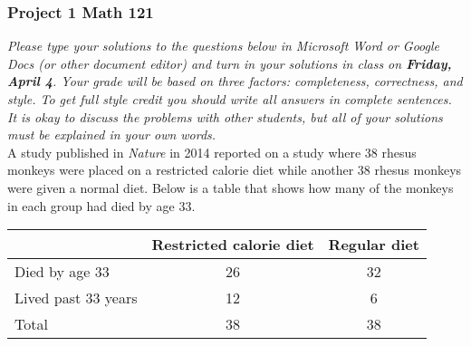\documentclass[12pt]{article}
\begin{document}
\subsubsection*{Project 1 \hfill Math 121}

\textit{Please type your solutions to the questions below in Microsoft Word or Google Docs (or other document editor) and turn in your solutions in class on \textbf{Friday, April 4}. Your grade will be based on three factors: completeness, correctness, and style. To get full style credit you should write all answers in complete sentences. It is okay to discuss the problems with other students, but all of your solutions must be explained in your own words. }  \\


A study published in \emph{Nature} in 2014 reported on a study where 38 rhesus monkeys were placed on a restricted calorie diet while another 38 rhesus monkeys were given a normal diet.  Below is a table that shows how many of the monkeys in each group had died by age 33.

\begin{center}
\begin{tabular}{l|c|c}
~ & Restricted calorie diet & Regular diet \\ \hline
Died by age 33 & 26 & 32 \\
Lived past 33 years & 12 & 6 \\ \hline
Total & 38 & 38
\end{tabular}
\end{center}
\end{document}
